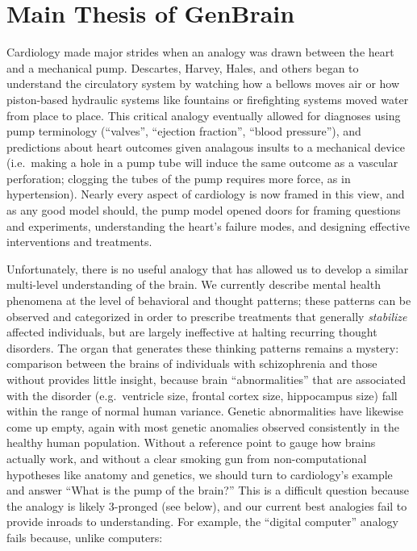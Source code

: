 \documentclass[
  letterpaper,
  DIV=11,
  numbers=noendperiod]{scrartcl}
\author{}
\date{}
\begin{document}
\section{Main Thesis of GenBrain}\label{main-thesis-of-genbrain}

Cardiology made major strides when an analogy was drawn between the
heart and a mechanical pump. Descartes, Harvey, Hales, and others began
to understand the circulatory system by watching how a bellows moves air
or how piston-based hydraulic systems like fountains or firefighting
systems moved water from place to place. This critical analogy
eventually allowed for diagnoses using pump terminology (``valves'',
``ejection fraction'', ``blood pressure''), and predictions about heart
outcomes given analagous insults to a mechanical device (i.e.~making a
hole in a pump tube will induce the same outcome as a vascular
perforation; clogging the tubes of the pump requires more force, as in
hypertension). Nearly every aspect of cardiology is now framed in this
view, and as any good model should, the pump model opened doors for
framing questions and experiments, understanding the heart's failure
modes, and designing effective interventions and treatments.

Unfortunately, there is no useful analogy that has allowed us to develop
a similar multi-level understanding of the brain. We currently describe
mental health phenomena at the level of behavioral and thought patterns;
these patterns can be observed and categorized in order to prescribe
treatments that generally \emph{stabilize} affected individuals, but are
largely ineffective at halting recurring thought disorders. The organ
that generates these thinking patterns remains a mystery: comparison
between the brains of individuals with schizophrenia and those without
provides little insight, because brain ``abnormalities'' that are
associated with the disorder (e.g.~ventricle size, frontal cortex size,
hippocampus size) fall within the range of normal human variance.
Genetic abnormalities have likewise come up empty, again with most
genetic anomalies observed consistently in the healthy human population.
Without a reference point to gauge how brains actually work, and without
a clear smoking gun from non-computational hypotheses like anatomy and
genetics, we should turn to cardiology's example and answer ``What is
the pump of the brain?'' This is a difficult question because the
analogy is likely 3-pronged (see below), and our current best analogies
fail to provide inroads to understanding. For example, the ``digital
computer'' analogy fails because, unlike computers:
\end{document}
